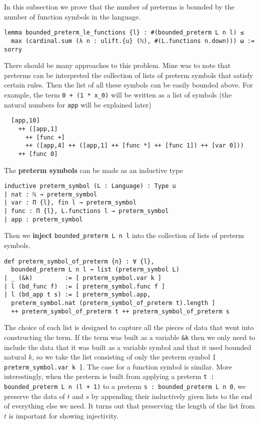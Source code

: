 \documentclass{article}
\newcommand{\<}{\langle}
\renewcommand{\>}{\rangle}
\theoremstyle{definitionstyle}
\theoremstyle{exercisestyle}
\theoremstyle{remarkstyle}
\begin{document}
In this subsection we prove that the number of preterms is bounded by
the number of function symbols in the language.

\begin{lstlisting}
lemma bounded_preterm_le_functions {l} : #(bounded_preterm L n l) ≤
  max (cardinal.sum (λ n : ulift.{u} (ℕ), #(L.functions n.down))) ω := sorry \end{lstlisting}

There should be many approaches to this problem.
Mine was to note that preterms can be interpreted
the collection of lists of preterm symbols that satisfy certain rules.
Then the list of all these symbols can be easily bounded above.
For example, the term \texttt{0 + (1 * x\_0)}
will be written as a list of symbols
(the natural numbers for \texttt{app} will be explained later)
\begin{lstlisting}
  [app,10]
    ++ ([app,1]
      ++ [func +]
      ++ ([app,4] ++ ([app,1] ++ [func *] ++ [func 1]) ++ [var 0]))
    ++ [func 0]
\end{lstlisting}

The \textbf{preterm symbols} can be made as an inductive type
\begin{lstlisting}
inductive preterm_symbol (L : Language) : Type u
| nat : ℕ → preterm_symbol
| var : Π {l}, fin l → preterm_symbol
| func : Π {l}, L.functions l → preterm_symbol
| app : preterm_symbol \end{lstlisting}

Then we \textbf{inject} \texttt{bounded\_preterm L n l}
into the collection of lists of preterm symbols.

\begin{lstlisting}
def preterm_symbol_of_preterm {n} : ∀ {l},
  bounded_preterm L n l → list (preterm_symbol L)
| _ (&k)         := [ preterm_symbol.var k ]
| l (bd_func f)  := [ preterm_symbol.func f ]
| l (bd_app t s) := [ preterm_symbol.app,
  preterm_symbol.nat (preterm_symbol_of_preterm t).length ]
  ++ preterm_symbol_of_preterm t ++ preterm_symbol_of_preterm s
 \end{lstlisting}

The choice of each list is designed to capture all
the pieces of data that went into constructing the term.
If the term was built as a variable \texttt{\&k}
then we only need to include the data that
it was built as a variable symbol and that it used bounded natural $k$,
so we take the list consisting of only
the preterm symbol \texttt{[ preterm\_symbol.var k ]}.
The case for a function symbol is similar.
More interestingly, when the preterm is built from
applying a preterm \texttt{t : bounded\_preterm L n (l + 1)}
to a preterm \texttt{s : bounded\_preterm L n 0},
we preserve the data of $t$ and $s$ by appending their
inductively given lists to the end of everything else we need.
It turns out that preserving the length of the list from $t$
is important for showing injectivity.
\end{document}
